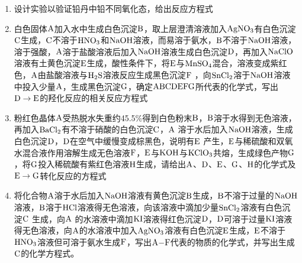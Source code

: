 \begin{enumerate}[label=\arabic*., start=1, itemsep=1.5ex]
    \item 设计实验以验证铅丹中铅不同氧化态，给出反应方程式
    \item 白色固体$\ce{A}$加入水中生成白色沉淀$\ce{B}$，取上层澄清溶液加入$\ce{AgNO3}$有白色沉淀$\ce{C}$生成，$\ce{C}$不溶于$\ce{HNO3}$和$\ce{NaOH}$溶液，而易溶于氨水，$\ce{B}$不溶于$\ce{NaOH}$溶液，溶于强酸，$\ce{A}$溶于盐酸溶液后加入$\ce{NaOH}$溶液生成白色沉淀$\ce{D}$，再加入$\ce{NaClO}$溶液有土黄色沉淀$\ce{E}$生成，酸性条件下，将$\ce{E}$与$\ce{MnSO4}$混合，溶液变成紫红色，$\ce{A}$由盐酸溶液与$\ce{H2S}$溶液反应生成黑色沉淀$\ce{F}$ ，向$\ce{SnCl2}$溶于$\ce{NaOH}$溶液中投入少量$\ce{A}$，生成黑色沉淀$\ce{G}$，确定$\ce{ABCDEFG}$所代表的化学式，写出$\ce{D\rightarrow E}$的羟化反应的相关反应方程式
    \item 粉红色晶体$\ce{A}$受热脱水失重约45.5\%得到白色粉末$\ce{B}$，$\ce{B}$溶于水得到无色溶液，再加入$\ce{BaCl2}$有不溶于硝酸的白色沉淀$\ce{C}$，$\ce{A}$ 溶于水后加入$\ce{NaOH}$溶液，生成白色沉淀$\ce{D}$，$\ce{D}$在空气中缓慢变成棕黑色，说明有$\ce{E}$ 产生，$\ce{E}$与稀硫酸和双氧水混合液作用溶解生成无色溶液$\ce{F}$，$\ce{E}$与$\ce{KOH}$与$\ce{KClO3}$共熔，生成绿色产物$\ce{G}$，将$\ce{G}$投入稀硫酸有紫红色溶液$\ce{H}$生成，请给出$\ce{A}$、$\ce{D}$、$\ce{E}$、$\ce{G}$、$\ce{H}$的化学式及$\ce{E\rightarrow G}$转化反应的方程式
    \item 将化合物$\ce{A}$溶于水后加入$\ce{NaOH}$溶液有黄色沉淀$\ce{B}$生成，$\ce{B}$不溶于过量的$\ce{NaOH}$溶液，$\ce{B}$溶于$\ce{HCl}$溶液得无色溶液，向该溶液中滴加少量$\ce{SnCl2}$溶液有白色沉淀$\ce{C}$ 生成，向$\ce{A}$ 的水溶液中滴加$\ce{KI}$溶液得红色沉淀$\ce{D}$，$\ce{D}$可溶于过量$\ce{KI}$溶液得无色溶液，向$\ce{A}$的水溶液中加入$\ce{AgNO3}$溶液有白色沉淀$\ce{E}$生成，$\ce{E}$不溶于$\ce{HNO3}$溶液但可溶于氨水生成$\ce{F}$，写出$\ce{A-F}$代表的物质的化学式，并写出生成$\ce{C}$的化学方程式。
\end{enumerate}